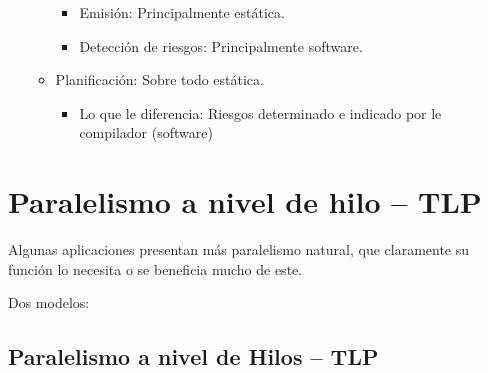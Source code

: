 \documentclass[12pt, twoside, openright]{report} %
\begin{document}
\begin{itemize}
\begin{itemize}
		            \begin{itemize}

			            \item Emisión: Principalmente estática.
			            \item Detección de riesgos: Principalmente software.
		            \end{itemize}
		      \item Planificación: Sobre todo estática.

		            \begin{itemize}

			            \item Lo que le diferencia: Riesgos determinado e indicado por le
			                  compilador (software)
		            \end{itemize}
	      \end{itemize}
\end{itemize}

\section{Paralelismo a nivel de hilo -- TLP}

Algunas aplicaciones presentan más paralelismo natural, que
claramente su función lo necesita o se beneficia mucho de este.

Dos modelos:
\subsection{Paralelismo a nivel de Hilos -- TLP}
\end{document}
